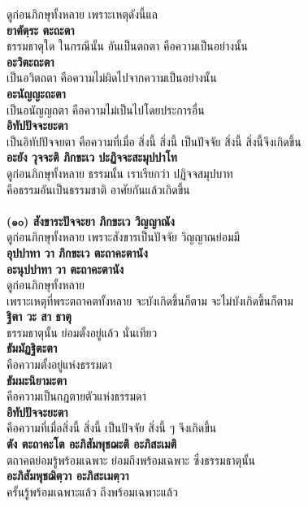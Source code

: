 \documentclass[12pt]{article}
\begin{document}
\indent ดูก่อนภิกษุทั้งหลาย เพราะเหตุดังนี้แล\\
\textbf{ยาตัตฺระ ตะถะตา}\\
\indent ธรรมธาตุใด ในกรณีนั้น อันเป็นตถตา คือความเป็นอย่างนั้น\\
\textbf{อะวิตะถะตา}\\
\indent เป็นอวิตถตา คือความไม่ผิดไปจากความเป็นอย่างนั้น\\
\textbf{อะนัญญะถะตา}\\
\indent เป็นอนัญญถตา คือความไม่เป็นไปโดยประการอื่น\\
\textbf{อิทัปปัจจะยะตา}\\
\indent เป็นอิทัปปัจจยตา คือความที่เมื่อ สิ่งนี้ สิ่งนี้ เป็นปัจจัย สิ่งนี้ สิ่งนี้จึงเกิดขึ้น\\
\textbf{อะยัง วุจจะติ ภิกขะเว ปะฏิจจะสะมุปปาโท}\\
\indent ดูก่อนภิกษุทั้งหลาย ธรรมนั้น เราเรียกว่า ปฏิจจสมุปบาท \\
\indent คือธรรมอันเป็นธรรมชาติ อาศัยกันแล้วเกิดขึ้น\\
\\
\textbf{(๑๐) สังขาระปัจจะยา ภิกขะเว วิญญาณัง}\\
\indent ดูก่อนภิกษุทั้งหลาย เพราะสังขารเป็นปัจจัย วิญญาณย่อมมี\\
\textbf{อุปปาทา วา ภิกขะเว ตะถาคะตานัง\\
อะนุปปาทา วา ตะถาคะตานัง}\\
\indent ดูก่อนภิกษุทั้งหลาย\\
\indent เพราะเหตุที่พระตถาคตทั้งหลาย จะบังเกิดขึ้นก็ตาม จะไม่บังเกิดขึ้นก็ตาม\\
\textbf{ฐิตา วะ สา ธาตุ}\\
\indent ธรรมธาตุนั้น ย่อมตั้งอยู่แล้ว นั่นเทียว\\
\textbf{ธัมมัฏฐิตะตา}\\
\indent คือความตั้งอยู่แห่งธรรมดา\\
\textbf{ธัมมะนิยามะตา}\\
\indent คือความเป็นกฎตายตัวแห่งธรรมดา\\
\textbf{อิทัปปัจจะยะตา}\\
\indent คือความที่เมื่อสิ่งนี้ สิ่งนี้ เป็นปัจจัย สิ่งนี้ ๆ จึงเกิดขึ้น\\
\textbf{ตัง ตะถาคะโต อะภิสัมพุชฌะติ อะภิสะเมติ}\\
\indent ตถาคตย่อมรู้พร้อมเฉพาะ ย่อมถึงพร้อมเฉพาะ ซึ่งธรรมธาตุนั้น\\
\textbf{อะภิสัมพุชฌิตฺวา อะภิสะเมตฺวา}\\
\indent ครั้นรู้พร้อมเฉพาะแล้ว ถึงพร้อมเฉพาะแล้ว\\
\end{document}
